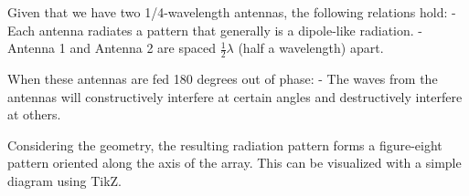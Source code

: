 Given that we have two 1/4-wavelength antennas, the following relations hold:
- Each antenna radiates a pattern that generally is a dipole-like radiation.
- Antenna 1 and Antenna 2 are spaced \( \frac{1}{2} \lambda \) (half a wavelength) apart. 

When these antennas are fed 180 degrees out of phase:
- The waves from the antennas will constructively interfere at certain angles and destructively interfere at others. 

Considering the geometry, the resulting radiation pattern forms a figure-eight pattern oriented along the axis of the array. This can be visualized with a simple diagram using TikZ.

